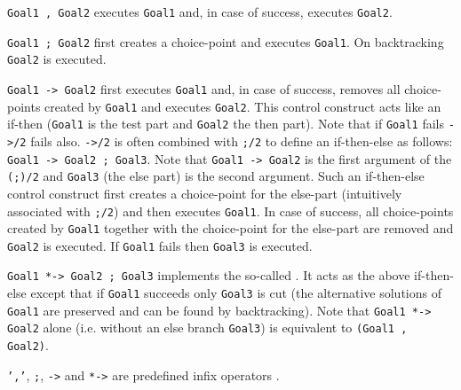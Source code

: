 \Description

\texttt{Goal1 , Goal2} executes \texttt{Goal1} and, in case of
success, executes \texttt{Goal2}.

\texttt{Goal1 ; Goal2} first creates a choice-point and executes
\texttt{Goal1}. On backtracking \texttt{Goal2} is executed.

\texttt{Goal1 -> Goal2} first executes \texttt{Goal1} and,
in case of success, removes all choice-points created by \texttt{Goal1} and
executes \texttt{Goal2}. This control construct acts like an if-then
(\texttt{Goal1} is the test part and \texttt{Goal2} the then part). Note that
if \texttt{Goal1} fails \texttt{->/2} fails also. \texttt{->/2} is
often combined with \texttt{;/2} to define an if-then-else as follows:
\texttt{Goal1 -> Goal2 ; Goal3}. Note that \texttt{Goal1 -> Goal2}
is the first argument of the \texttt{(;)/2} and \texttt{Goal3} (the else
part) is the second argument. Such an if-then-else control construct first
creates a choice-point for the else-part (intuitively associated with
\texttt{;/2}) and then executes \texttt{Goal1}. In case of success, all
choice-points created by \texttt{Goal1} together with the choice-point for
the else-part are removed and \texttt{Goal2} is executed. If \texttt{Goal1}
fails then \texttt{Goal3} is executed.

\texttt{Goal1 *-> Goal2 ; Goal3} implements the so-called
. It acts as the above if-then-else except that if
\texttt{Goal1} succeeds only \texttt{Goal3} is cut (the alternative solutions
of \texttt{Goal1} are preserved and can be found by backtracking). Note that
\texttt{Goal1 *-> Goal2} alone (i.e. without an else branch
\texttt{Goal3}) is equivalent to \texttt{(Goal1 , Goal2)}.


\texttt{','}, \texttt{;}, \texttt{->} and \texttt{*->} are predefined
infix operators .

\begin{PlErrors}





\end{PlErrors}

